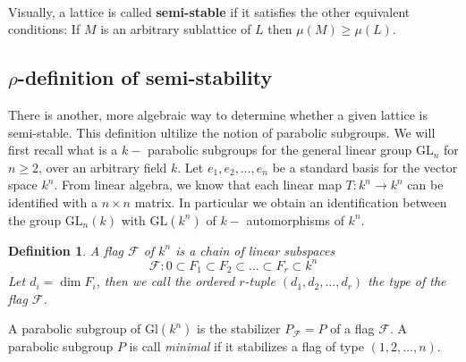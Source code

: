 \documentclass[12pt]{article} %
\newtheorem{definition}{Definition}[section]
\begin{document}
\begin{figure}[h]
\begin{minipage}{.2\textwidth}
~
    \end{minipage}
\end{figure}
Visually, a lattice is called \textbf{semi-stable} if it satisfies the other equivalent
conditions:   If $M$ is an arbitrary sublattice of $L$ then $\mu(M) \ge \mu(L)$.
\subsection{$\rho$-definition of semi-stability}
There is another, more algebraic way to determine whether a given lattice is semi-stable.
This definition ultilize the notion of parabolic subgroups. We will first recall what
is a $k-$ parabolic subgroups for the general linear group $\text{GL}_n$ for $n \ge 2$, over an arbitrary
field $k$. Let $e_1,e_2,\ldots,e_n$ be a standard basis for the vector space $k^n$. From linear algebra,
we know that each linear map $T \colon k^n \to k^n$ can be identified with a $n \times n$ matrix. In particular
we obtain an identification between the group $\text{GL}_n(k)$ with $\text{GL}(k^n)$ of $k-$ automorphisms of
$k^n$.
\begin{definition}
    A flag $\mathcal{F}$ of $k^n$ is a chain of linear subspaces
    \[\mathcal{F} \colon 0 \subset F_1 \subset F_2 \subset \ldots \subset F_r \subset k^n\]
    Let $d_i = \dim F_i$, then we call the ordered $r$-tuple $(d_1,d_2,\ldots,d_r)$  the \textit{type} of the flag $\mathcal{F}$.
\end{definition}
A parabolic subgroup of $\text{Gl}(k^n)$ is the stabilizer $P_\mathcal{F} = P$ of a flag $\mathcal{F}$.
A parabolic subgroup $P$ is call \textit{minimal} if it stabilizes a flag of type
$(1,2,\ldots,n)$.
\end{document}

